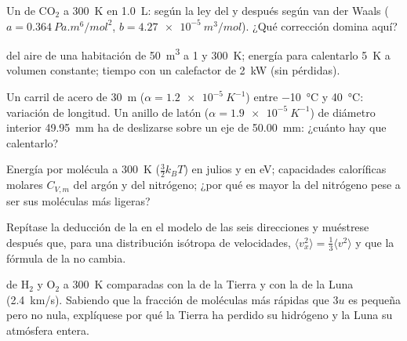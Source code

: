 \begin{exercise}[$\star\star$]\label{exo:b1:kinetic-theory:7}
Un  de CO$_2$ a \qty{300}{K} en \qty{1.0}{L}:  según la ley del
 y después según van der Waals ($a = \qty{0.364}{Pa.m^6/mol^2}$,
$b = \qty{4.27e-5}{m^3/mol}$). ¿Qué corrección domina aquí?
\end{exercise}

\begin{exercise}[$\star\star$]\label{exo:b1:kinetic-theory:8}
 del aire de una habitación de \qty{50}{m^3} a \qty{1}{}
y \qty{300}{K}; energía para calentarlo \qty{5}{K} a volumen constante;
tiempo con un calefactor de \qty{2}{kW} (sin pérdidas).
\end{exercise}

\begin{exercise}[$\star\star$]\label{exo:b1:kinetic-theory:9}
Un carril de acero de \qty{30}{m} ($\alpha = \qty{1.2e-5}{K^{-1}}$) entre
\qty{-10}{\degreeCelsius} y \qty{40}{\degreeCelsius}: variación de
longitud. Un anillo de latón ($\alpha = \qty{1.9e-5}{K^{-1}}$) de diámetro
interior \qty{49.95}{mm} ha de deslizarse sobre un eje de \qty{50.00}{mm}:
¿cuánto hay que calentarlo?
\end{exercise}

\begin{exercise}[$\star\star\star$]\label{exo:b1:kinetic-theory:10}
Energía por molécula a \qty{300}{K} ($\tfrac32 k_BT$) en julios y en eV;
capacidades caloríficas molares $C_{V,m}$ del argón y del nitrógeno; ¿por
qué es mayor la del nitrógeno pese a ser sus moléculas más ligeras?
\end{exercise}

\begin{exercise}[$\star\star\star$]\label{exo:b1:kinetic-theory:11}
Repítase la deducción de la  en el modelo de las seis
direcciones y muéstrese después que, para una distribución isótropa de
velocidades, $\langle v_x^2\rangle
= \tfrac13\langle v^2\rangle$ y que la fórmula de la  no cambia.
\end{exercise}

\begin{exercise}[$\star\star\star$]\label{exo:b1:kinetic-theory:12}
 de H$_2$ y O$_2$ a \qty{300}{K} comparadas
con la  de la Tierra y con la de la Luna
(\qty{2.4}{km/s}). Sabiendo que la fracción de moléculas más rápidas que
$3u$ es pequeña pero no nula, explíquese por qué la Tierra ha perdido su
hidrógeno y la Luna su atmósfera entera.
\end{exercise}

